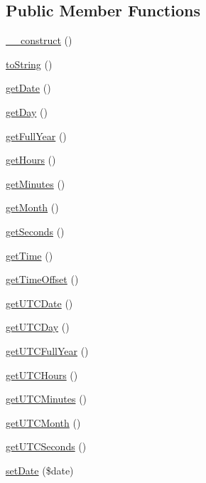 \subsection*{Public Member Functions}
\begin{DoxyCompactItemize}
\item 
\hyperlink{class_date_a095c5d389db211932136b53f25f39685}{\-\_\-\-\_\-construct} ()
\item 
\hyperlink{class_date_a5558c5d549f41597377fa1ea8a1cefa3}{to\-String} ()
\item 
\hyperlink{class_date_a24d89b0ad05ea2e33626b1fc8ed59bc3}{get\-Date} ()
\item 
\hyperlink{class_date_a36d79672aa73c68abedc5741b12956d2}{get\-Day} ()
\item 
\hyperlink{class_date_ad7182693b12e854aa3b66d28a1fd4f00}{get\-Full\-Year} ()
\item 
\hyperlink{class_date_addcf19baf9c23f5f32438ecaa4acf057}{get\-Hours} ()
\item 
\hyperlink{class_date_a1c4f5f86b74ac6d5fe186a788e428375}{get\-Minutes} ()
\item 
\hyperlink{class_date_a7dad544a9a0e8b1a8bd0469d2cfeb13d}{get\-Month} ()
\item 
\hyperlink{class_date_a7ec817f6d72bb091cc3d5a9fc2eb2fcc}{get\-Seconds} ()
\item 
\hyperlink{class_date_a57c78d9f0aa316ee2fdd6995e2a06ce3}{get\-Time} ()
\item 
\hyperlink{class_date_ac52e6c4e5811af6bcd626f35df70cc93}{get\-Time\-Offset} ()
\item 
\hyperlink{class_date_a6eefd513ce34183f0137af1bb55494ce}{get\-U\-T\-C\-Date} ()
\item 
\hyperlink{class_date_acc23daeff3b28149fcec459e8002aeaa}{get\-U\-T\-C\-Day} ()
\item 
\hyperlink{class_date_a365c6684263d543466158476e05ac083}{get\-U\-T\-C\-Full\-Year} ()
\item 
\hyperlink{class_date_a56de44be8539f93017c8feb5f9a829b5}{get\-U\-T\-C\-Hours} ()
\item 
\hyperlink{class_date_ac01113458ac282b4508313cd3d998571}{get\-U\-T\-C\-Minutes} ()
\item 
\hyperlink{class_date_af3b25db18dcb5802875d7bc3d2e424bd}{get\-U\-T\-C\-Month} ()
\item 
\hyperlink{class_date_a6297fb7cd80ad5d3dbb80d3457a5bc16}{get\-U\-T\-C\-Seconds} ()
\item 
\hyperlink{class_date_a2570e83b20f9be514f22e3fd0b7c0d17}{set\-Date} (\$date)

\end{DoxyCompactItemize}
